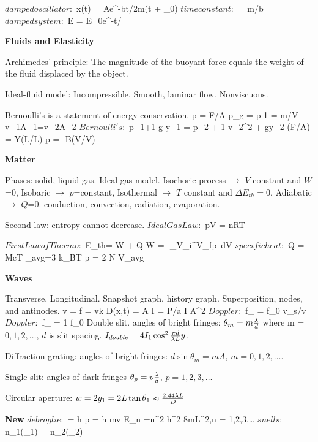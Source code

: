 {\Fm $damped oscillator: $ x(t) = Ae^{-bt/2m}\cos(\omega t + \phi_0)\Mf
\Fm $time constant: $ \tau = m/b\Mf
\Fm $damped system: $ E = E_0e^{-t/\tau}\Mf
\EndDis


{\bf Fluids and Elasticity}

Archimedes' principle: The magnitude of the buoyant force equals the weight of the fluid displaced by the object.

Ideal-fluid model: Incompressible. Smooth, laminar flow. Nonviscuous.

Bernoulli's is a statement of energy conservation.
\Dis 5pt 
\baselineskip=22pt
\Fm p = F/A\Mf
\Fm p_g = p-1\Mf
\Fm \rho = m/V \Mf
\Fm v_1A_1=v_2A_2\Mf
\Fm $Bernoulli's: $ p_1+{1 }\rho g y_1 = p_2 + {1 }\rho v_2^2 + \rho gy_2\Mf
\Fm (F/A) = Y(\Delta L/L)\Mf
\Fm p = -B(\Delta V/V)\Mf
\EndDis

{\bf Matter}

Phases: solid, liquid gas. Ideal-gas model. Isochoric process $\rightarrow$ $V$ constant and $W$=0, Isobaric $\rightarrow$ $p$=constant, Isothermal $\rightarrow$ $T$ constant and $\Delta E_{th}=0$, Adiabatic $\rightarrow$ $Q$=0. conduction, convection, radiation, evaporation. 

Second law: entropy cannot decrease.
\Dis 5pt 
\baselineskip=22pt
\Fm $Ideal Gas Law: $ pV = nRT \Mf

\Fm $First Law of Thermo: $ \Delta E_{th}= W + Q \Mf
\Fm W = -\int_{V_{\rm i}}^{V_{\rm f}}{p\ dV} \Mf
\Fm $specific heat: $ Q = Mc\Delta T \Mf
\Fm \epsilon_{\rm avg}={3 }k_{\rm B}T\Mf
\Fm p = {2 }{N \over V}\epsilon_{\rm avg}\Mf
\EndDis

{\bf Waves}

Transverse, Longitudinal.  Snapshot graph, history graph. Superposition, nodes, and antinodes.
\Dis 5pt 
\baselineskip=22pt
\Fm v = \lambda f\Mf
\Fm \omega = vk\Mf
\Fm D(x,t) = A\Mf
\Fm I = P/a\Mf
\Fm I \propto A^2\Mf
\Fm $Doppler: $ f_{\pm} = {f_0  \mp v_s/v}\Mf
\Fm $Doppler: $ f_{\pm} = 1 f_0 \Mf
\EndDis
Double slit. angles of bright fringes: $\theta_m=m{\lambda \over d}$ where m = $0,1,2,\dots$, $d$ is slit spacing.
\quad $I_{double}=4I_1\cos^2{{\pi d \over \lambda L}y}$.

Diffraction grating: angles of bright fringes: $d\sin{\theta_m} = mA$, $m=0,1,2,\dots$.

Single slit: angles of dark fringes $\theta_p=p{\lambda \over a}$, $p = 1,2,3,\dots$

Circular aperture: $w = 2y_1=2L\tan{\theta_1}\approx {2.44\lambda L\over D}$

{\bf New}
\Dis 5pt 
\baselineskip=22pt
\Fm $de broglie: $ \lambda = {h \over p} = {h \over mv}\Mf
\Fm E_n =n^2 {h^2 \over 8mL^2},\enskip n = 1,2,3,\dots \Mf
\Fm $snells: $ n_1\sin(\theta_1) = n_2\sin(\theta_2) \Mf
\EndDis



}

